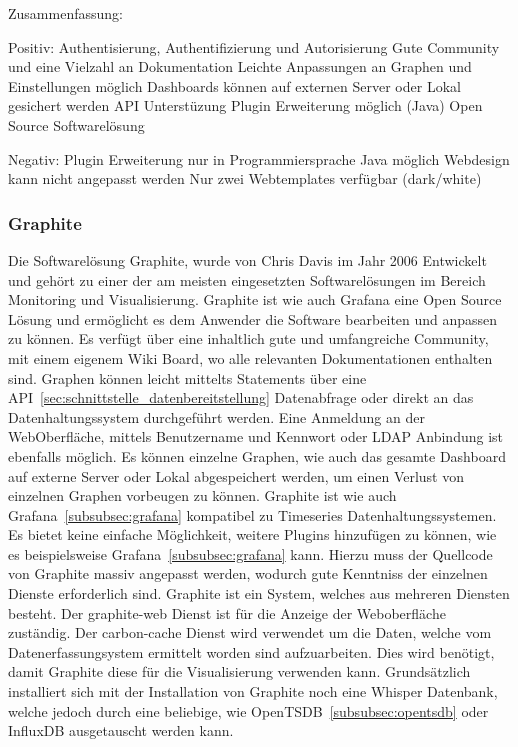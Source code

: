 Zusammenfassung:

\begin{outline}
  Positiv:
  \1 Authentisierung, Authentifizierung und Autorisierung
  \1 Gute Community und eine Vielzahl an Dokumentation
  \1 Leichte Anpassungen an Graphen und Einstellungen möglich
  \1 Dashboards können auf externen Server oder Lokal gesichert werden
  \1 API Unterstüzung
  \1 Plugin Erweiterung möglich (Java)
  \1 Open Source Softwarelösung

  Negativ:
  \1 Plugin Erweiterung nur in Programmiersprache Java möglich
  \1 Webdesign kann nicht angepasst werden
  \1 Nur zwei Webtemplates verfügbar (dark/white)
\end{outline}

\subsubsection{Graphite}
\label{subsubsec:graphite}
Die Softwarelösung Graphite, wurde von Chris Davis im Jahr 2006 Entwickelt und
gehört zu einer der am meisten eingesetzten Softwarelösungen im Bereich
Monitoring und Visualisierung. Graphite ist wie auch Grafana eine Open Source
Lösung und ermöglicht es dem Anwender die Software bearbeiten und anpassen zu
können. Es verfügt über eine inhaltlich gute und umfangreiche Community, mit
einem eigenem Wiki Board, wo alle relevanten Dokumentationen enthalten sind.
Graphen können leicht mittelts Statements über eine
API~\ref{sec:schnittstelle_datenbereitstellung} Datenabfrage oder direkt an das
Datenhaltungssystem durchgeführt werden. Eine Anmeldung an der WebOberfläche,
mittels Benutzername und Kennwort oder \gls{LDAP} Anbindung ist ebenfalls
möglich. Es können einzelne Graphen, wie auch das gesamte Dashboard auf externe
Server oder Lokal abgespeichert werden, um einen Verlust von einzelnen Graphen
vorbeugen zu können. Graphite ist wie auch Grafana~\ref{subsubsec:grafana}
kompatibel zu Timeseries Datenhaltungssystemen. Es bietet keine einfache
Möglichkeit, weitere Plugins hinzufügen zu können, wie es beispielsweise
Grafana~\ref{subsubsec:grafana} kann. Hierzu muss der Quellcode von Graphite
massiv angepasst werden, wodurch gute Kenntniss der einzelnen Dienste
erforderlich sind. Graphite ist ein System, welches aus mehreren Diensten
besteht. Der graphite-web Dienst ist für die Anzeige der Weboberfläche
zuständig. Der carbon-cache Dienst wird verwendet um die Daten, welche vom
Datenerfassungsystem ermittelt worden sind aufzuarbeiten. Dies wird benötigt,
damit Graphite diese für die Visualisierung verwenden kann. Grundsätzlich
installiert sich mit der Installation von Graphite noch eine Whisper Datenbank,
welche jedoch durch eine beliebige, wie OpenTSDB~\ref{subsubsec:opentsdb} oder
InfluxDB ausgetauscht werden kann.


